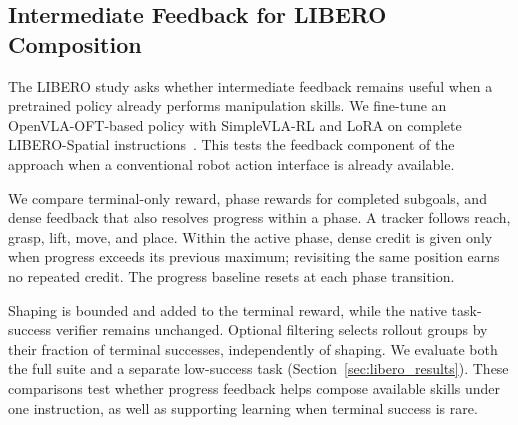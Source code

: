 \subsection{Intermediate Feedback for LIBERO Composition}\label{sec:dense_method}
The LIBERO study asks whether intermediate feedback remains useful when a pretrained policy already performs manipulation skills. We fine-tune an OpenVLA-OFT-based policy with SimpleVLA-RL and LoRA on complete LIBERO-Spatial instructions~\cite{openvlaoft,simplevlarl,libero}. This tests the feedback component of the approach when a conventional robot action interface is already available.

We compare terminal-only reward, phase rewards for completed subgoals, and dense feedback that also resolves progress within a phase. A tracker follows reach, grasp, lift, move, and place. Within the active phase, dense credit is given only when progress exceeds its previous maximum; revisiting the same position earns no repeated credit. The progress baseline resets at each phase transition.

Shaping is bounded and added to the terminal reward, while the native task-success verifier remains unchanged. Optional filtering selects rollout groups by their fraction of terminal successes, independently of shaping. We evaluate both the full suite and a separate low-success task (Section~\ref{sec:libero_results}). These comparisons test whether progress feedback helps compose available skills under one instruction, as well as supporting learning when terminal success is rare.
